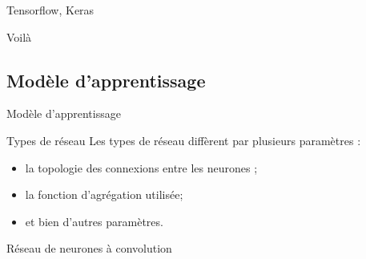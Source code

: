 \documentclass[10pt,handout]{beamer}
\newif\ifplacelogo %
\begin{document}
\begin{frame}{Tensorflow, Keras}
    
\end{frame}

\begin{frame}{Voilà}
    
\end{frame}

\placelogofalse 
\subsection{Modèle d'apprentissage}
\begin{frame}{Modèle d'apprentissage}
    \begin{block}{Types de réseau}
        Les types de réseau diffèrent par plusieurs paramètres :
        \begin{itemize}
            \item la topologie des connexions entre les neurones ;
            \item la fonction d’agrégation utilisée;
            \item et bien d’autres paramètres.
        \end{itemize}
    \end{block}

\end{frame}
\placelogotrue 

\begin{frame}{Réseau de neurones à convolution}
\end{frame}
\end{document}
